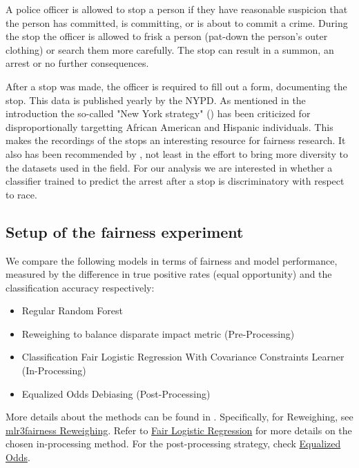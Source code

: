 A police officer is allowed to stop a person if they have reasonable suspicion that the person has committed, is committing, or is about to commit a crime.
During the stop the officer is allowed to frisk a person (pat-down the person's outer clothing) or search them more carefully.
The stop can result in a summon, an arrest or no further consequences.\par
After a stop was made, the officer is required to fill out a form, documenting the stop. This data is published yearly by the NYPD.
As mentioned in the introduction the so-called "New York strategy" (\cite{gelman2007}) has been criticized for disproportionally targetting African American and Hispanic individuals. This makes the recordings of the stops an interesting resource for fairness research.
It also has been recommended by \cite{Fabris_2022}, not least in the effort to bring more diversity to the datasets used in the field.
For our analysis we are interested in whether a classifier trained to predict the arrest after a stop is discriminatory with respect to race.


\subsection{Setup of the fairness experiment}
We compare the following models in terms of fairness and model performance, measured by the difference in true positive rates (equal opportunity)  and the classification accuracy respectively:
\begin{itemize}
    \item Regular Random Forest
    \item Reweighing to balance disparate impact metric (Pre-Processing)
    \item Classification Fair Logistic Regression With Covariance Constraints Learner (In-Processing)
    \item Equalized Odds Debiasing (Post-Processing)
\end{itemize}
More details about the methods can be found in \cite{mlr3_book}.  
Specifically, for Reweighing, see \href{https://mlr3fairness.mlr-org.com/reference/mlr_pipeops_reweighing.html}{mlr3fairness Reweighing}.  
Refer to \href{https://rdrr.io/cran/mlr3fairness/man/mlr_learners_classif.fairzlrm.html}{Fair Logistic Regression} for more details on the chosen in-processing method.  
For the post-processing strategy, check \href{https://mlr3fairness.mlr-org.com/reference/mlr_pipeops_equalized_odds.html}{Equalized Odds}.  


